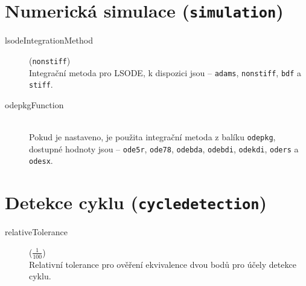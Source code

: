 \section{Numerická simulace (\texttt{simulation})}

\begin{description}
	\item[lsodeIntegrationMethod] (\texttt{nonstiff}) \\
		Integrační metoda pro LSODE, k dispozici jsou -- \texttt{adams}, \texttt{nonstiff}, \texttt{bdf} a \texttt{stiff}.
	\item[odepkgFunction] ~\\
		Pokud je nastaveno, je použita integrační metoda z balíku \texttt{odepkg}, dostupné hodnoty jsou
		 -- \texttt{ode5r}, \texttt{ode78}, \texttt{odebda}, \texttt{odebdi}, \texttt{odekdi}, \texttt{oders} a \texttt{odesx}.
\end{description}

\section{Detekce cyklu (\texttt{cycledetection})}

\begin{description}
	\item[relativeTolerance] ($\frac{1}{100}$) \\
		Relativní tolerance pro ověření ekvivalence dvou bodů pro účely detekce cyklu.
\end{description}
